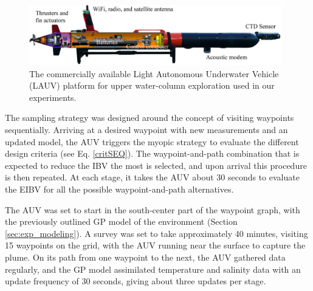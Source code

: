 \documentclass[aoas]{imsart}
\begin{document}
\begin{figure}[!h] 
\centering 
\includegraphics[width=0.98\textwidth]{Figures/harald.jpg}
\caption{The commercially available Light Autonomous Underwater
  Vehicle (LAUV) platform for upper water-column exploration used in
  our experiments.}
\label{fig:lauv}
\end{figure} 

The sampling strategy was designed around the concept of visiting
waypoints sequentially. Arriving at a desired waypoint with new
measurements and an updated model, the AUV triggers the myopic
strategy to evaluate the different design criteria (see
Eq. \eqref{critSEQ}). The waypoint-and-path combination that is
expected to reduce the IBV the most is selected, and upon arrival this
procedure is then repeated. At each stage, it takes the AUV about 30
seconds to evaluate the EIBV for all the possible waypoint-and-path
alternatives.

The AUV was set to start in the south-center part of the waypoint
graph, with the previously outlined GP model of the environment
(Section \ref{sec:exp_modeling}). A survey was set to take
approximately 40 minutes, visiting 15 waypoints on the grid, with the
AUV running near the surface to capture the plume. On its path from
one waypoint to the next, the AUV gathered data regularly, and the GP
model assimilated temperature and salinity data with an update
frequency of 30 seconds, giving about three updates per stage.
\end{document}

